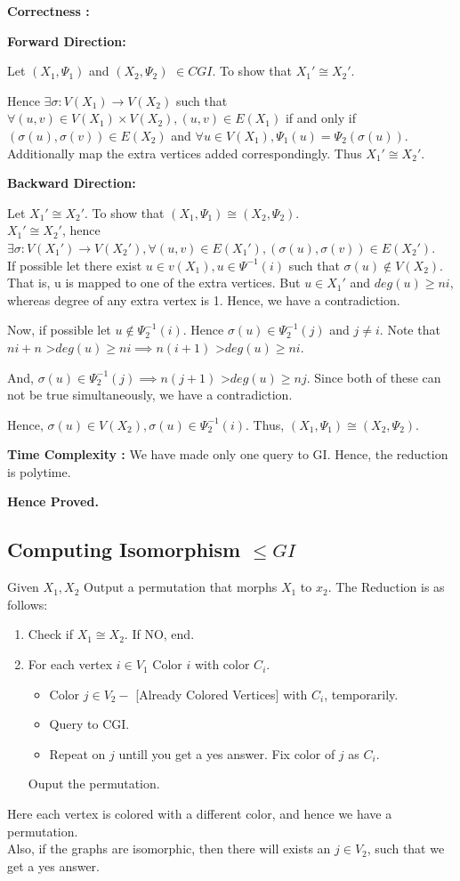 \textbf{Correctness :}

\textbf{Forward Direction:}

Let $(X_1,\Psi_1)$ and $(X_2,\Psi_2)$ $\in CGI$. To show that $X_1' \cong X_2'$.

Hence $\exists \sigma : V(X_1) \rightarrow V(X_2)$ such that 
$\forall (u,v) \in V(X_1)\times V(X_2), (u,v) \in E(X_1)$ 
if and only if $(\sigma(u), \sigma(v)) \in E(X_2) $ and $\forall u \in V(X_1) , \Psi_1(u) = \Psi_2(\sigma(u))$. Additionally map the extra vertices added correspondingly. Thus $X_1' \cong X_2'$.


\textbf{Backward Direction:}


Let $X_1' \cong X_2'$. To show that $(X_1,\Psi_1) \cong (X_2,\Psi_2)$.\\
$X_1' \cong X_2'$, hence $ \exists \sigma : V(X_1') \rightarrow V(X_2'), \forall (u,v) \in E(X_1'), (\sigma(u),\sigma(v)) \in E(X_2')$.\\
If possible let there exist $ u \in v(X_1), u \in \Psi^{-1}(i)$ such that $\sigma(u) \notin V(X_2)$. That is, u is mapped to one of the extra vertices. But $u \in X_1'$ and $deg(u) \ge ni$, whereas degree of any extra vertex is 1. Hence, we have a contradiction.

Now, if possible let $u \notin \Psi_2^{-1}(i)$. Hence $\sigma(u) \in \Psi_2^{-1}(j)$ and $j \neq i$. Note that $ni + n$ \textgreater $deg(u) \ge ni \implies n(i+1)$ \textgreater $deg(u) \ge ni$.

And, $\sigma(u) \in \Psi_2^{-1}(j) \implies n(j+1)$ \textgreater $deg(u) \ge nj$. Since both of these can not be true simultaneously, we have a contradiction.

Hence, $\sigma(u) \in V(X_2) , \sigma(u) \in \Psi_2^{-1}(i)$. Thus, $(X_1,\Psi_1) \cong (X_2,\Psi_2)$.

\textbf{Time Complexity :} We have made only one query to GI. Hence, the reduction is polytime.

\textbf{Hence Proved.}

\subsection{Computing Isomorphism $\le GI$}
Given $X_1,X_2$ Output a permutation that morphs $X_1$ to $x_2$.
The Reduction is as follows:
\begin{enumerate}
\item Check if $X_1 \cong X_2$. If NO, end.
\item For each vertex $i \in V_1$ 
	Color $i$ with color $C_i$.
	\begin{itemize}
	\item Color $j \in V_2 -$ [Already Colored Vertices] with $C_i$, temporarily.
	\item Query to CGI.
	\item Repeat on $j$ untill you get a yes answer. Fix color of $j$ as $C_i$.
	\end{itemize}
Ouput the permutation.
\end{enumerate}
Here each vertex is colored with a different color, and hence we have a permutation.\\
Also, if the graphs are isomorphic, then there will exists an $j \in V_2$, such that we get a yes answer.

